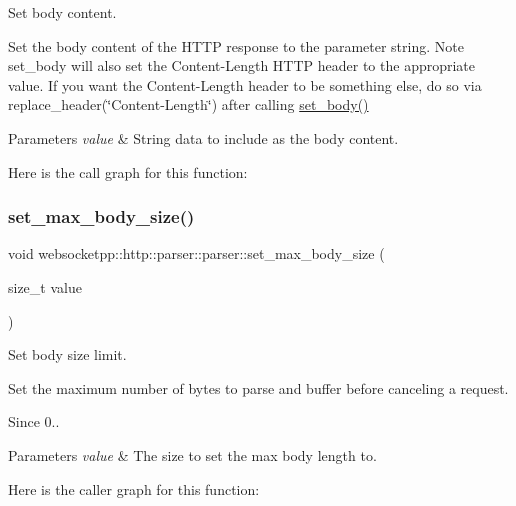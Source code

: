 Set body content. 

Set the body content of the H\+T\+TP response to the parameter string. Note set\+\_\+body will also set the Content-\/\+Length H\+T\+TP header to the appropriate value. If you want the Content-\/\+Length header to be something else, do so via replace\+\_\+header(\char`\"{}\+Content-\/\+Length\char`\"{}) after calling \mbox{\hyperlink{classwebsocketpp_1_1http_1_1parser_1_1parser_a71a4989eaa0ca802cf77678d0ca2d70d}{set\+\_\+body()}}


\begin{DoxyParams}{Parameters}
{\em value} & String data to include as the body content. \\
\hline
\end{DoxyParams}
Here is the call graph for this function\+:
\mbox{\label{classwebsocketpp_1_1http_1_1parser_1_1parser_ab6583e865254d1608732498d839d8385}} 
\subsubsection{\texorpdfstring{set\+\_\+max\+\_\+body\+\_\+size()}{set\_max\_body\_size()}}
{\footnotesize\ttfamily void websocketpp\+::http\+::parser\+::parser\+::set\+\_\+max\+\_\+body\+\_\+size (\begin{DoxyParamCaption}\item[{size\+\_\+t}]{value }\end{DoxyParamCaption})\hspace{0.3cm}{\ttfamily [inline]}}



Set body size limit. 

Set the maximum number of bytes to parse and buffer before canceling a request.

\begin{DoxySince}{Since}
0..
\end{DoxySince}

\begin{DoxyParams}{Parameters}
{\em value} & The size to set the max body length to. \\
\hline
\end{DoxyParams}
Here is the caller graph for this function\+:
\mbox{\label{classwebsocketpp_1_1http_1_1parser_1_1parser_a5c2e0e2bc0b2769db5a785b7d47a66ee}} 
